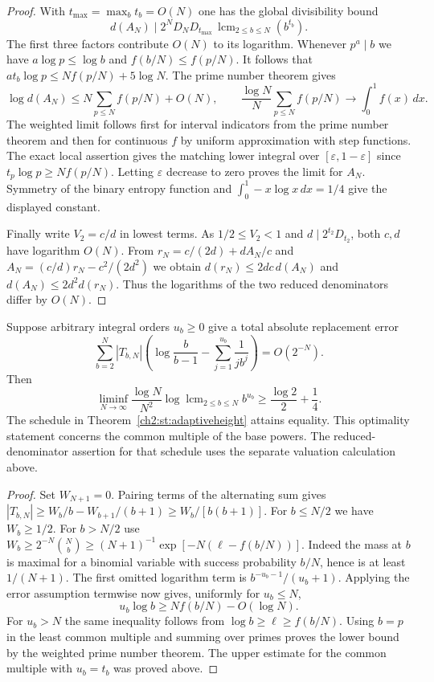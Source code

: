 \documentclass[11pt,a4paper,oneside,openany]{report}
\theoremstyle{remark}\newtheorem{remark}[theorem]{Remark}
\numberwithin{equation}{section}
\begin{document}
\begin{proof}
With $t_{\max}=\max_b t_b=O(N)$ one has the global divisibility bound
\[
 d(A_N)\mid 2^N D_N D_{t_{\max}}\,
                      \operatorname{lcm}_{2\le b\le N}(b^{t_b}).
\]
The first three factors contribute $O(N)$ to its logarithm.
Whenever $p^a\mid b$ we have $a\log p\le\log b$ and $f(b/N)\le f(p/N)$.
It follows that $a t_b\log p\le N f(p/N)+5\log N$.
The prime number theorem gives
\[
 \log d(A_N)\le N\sum_{p\le N} f(p/N)+O(N),\qquad
 \frac{\log N}{N}\sum_{p\le N}f(p/N)\longrightarrow\int_0^1 f(x)\,dx .
\]
The weighted limit follows first for interval indicators from the
prime number theorem and then for continuous $f$ by uniform
approximation with step functions. The exact local assertion gives
the matching lower integral over $[\varepsilon,1-\varepsilon]$ since
$t_p\log p\ge Nf(p/N)$. Letting $\varepsilon$ decrease to zero
proves the limit for $A_N$. Symmetry of the binary entropy function
and $\int_0^1-x\log x\,dx=1/4$ give the displayed constant.

Finally write $V_2=c/d$ in lowest terms. As $1/2\le V_2<1$ and
$d\mid2^{t_2}D_{t_2}$, both $c,d$ have logarithm $O(N)$.
From $r_N=c/(2d)+d A_N/c$ and
$A_N=(c/d)r_N-c^2/(2d^2)$ we obtain
$d(r_N)\le2dc\,d(A_N)$ and $d(A_N)\le2d^2d(r_N)$.
Thus the logarithms of the two reduced denominators differ by $O(N)$.
\end{proof}

\begin{proposition}\label{ch2:st:adaptiveopt}
Suppose arbitrary integral orders $u_b\ge0$ give a total absolute
replacement error
\[
 \sum_{b=2}^N |T_{b,N}|
 \left(\log\frac b{b-1}-\sum_{j=1}^{u_b}\frac1{j b^j}\right)
 =O(2^{-N}).
\]
Then
\[
 \liminf_{N\to\infty}\frac{\log N}{N^2}
 \log\operatorname{lcm}_{2\le b\le N} b^{u_b}
 \ge \frac{\log2}{2}+\frac14.
\]
The schedule in Theorem~\ref{ch2:st:adaptiveheight} attains equality.
This optimality statement concerns the common multiple of the base
powers. The reduced-denominator assertion for that schedule uses the
separate valuation calculation above.
\end{proposition}

\begin{proof}
Set $W_{N+1}=0$. Pairing terms of the alternating sum gives
$|T_{b,N}|\ge W_b/b-W_{b+1}/(b+1)\ge W_b/[b(b+1)]$.
For $b\le N/2$ we have $W_b\ge1/2$. For $b>N/2$ use
$W_b\ge 2^{-N}\binom Nb\ge (N+1)^{-1}
\exp[-N(\ell-f(b/N))]$.
Indeed the mass at $b$ is maximal for a binomial variable with
success probability $b/N$, hence is at least $1/(N+1)$.
The first omitted logarithm term is $b^{-u_b-1}/(u_b+1)$.
Applying the error assumption termwise now gives, uniformly for $u_b\le N$,
\[
 u_b\log b\ge N f(b/N)-O(\log N).
\]
For $u_b>N$ the same inequality follows from $\log b\ge\ell\ge f(b/N)$.
Using $b=p$ in the least common multiple and summing over primes proves
the lower bound by the weighted prime number theorem. The upper
estimate for the common multiple with $u_b=t_b$ was proved above.
\end{proof}
\end{document}

